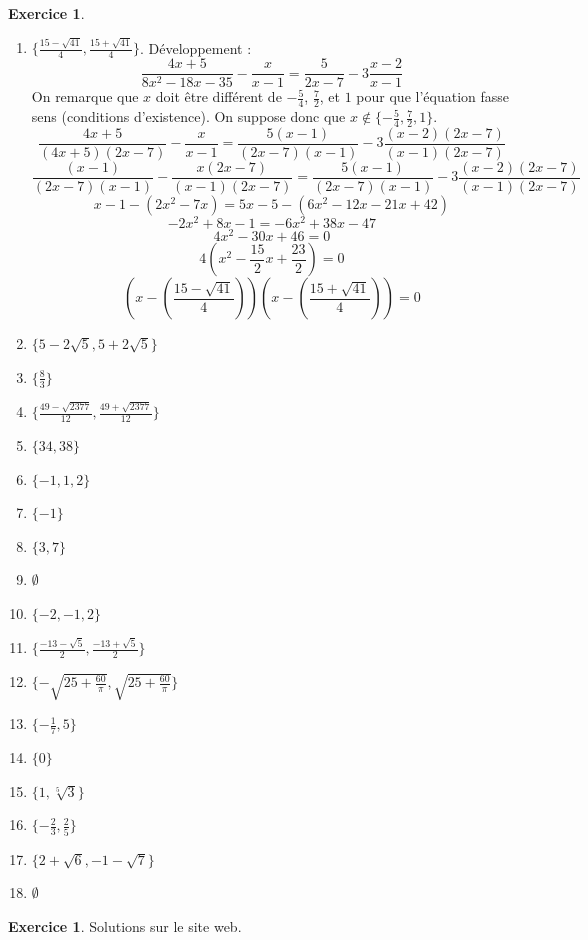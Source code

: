 \documentclass[a4paper,13pt]{scrreprt}
\theoremstyle{plain}
\theoremstyle{definition}
\newtheorem{exo}[subsection]{Exercice}
\begin{document}
\begin{exo} \begin{enumerate}
		\item $\{ \frac{15 - \sqrt{41}}{4},\frac{15 + \sqrt{41}}{4} \}$. Développement : \\
		$$\frac{4x+5}{8x^2-18x-35} - \frac{x}{x-1} = \frac{5}{2x-7}-3\frac{x-2}{x-1}$$
		On remarque que $x$ doit être différent de $-\frac{5}{4}$, $\frac{7}{2}$, et $1$ pour que l'équation fasse sens (conditions d'existence). On suppose donc que $x \notin \{ -\frac{5}{4}, \frac{7}{2} , 1 \}$.
		$$\frac{4x+5}{(4x+5)(2x-7)} - \frac{x}{x-1} = \frac{5(x-1)}{(2x-7)(x-1)}-3\frac{(x-2)(2x-7)}{(x-1)(2x-7)}$$
		$$\frac{(x-1)}{(2x-7)(x-1)} - \frac{x(2x-7)}{(x-1)(2x-7)} = \frac{5(x-1)}{(2x-7)(x-1)}-3\frac{(x-2)(2x-7)}{(x-1)(2x-7)}$$
		$$x-1 - (2x^2 - 7x) = 5x - 5 - (6x^2 - 12 x - 21x + 42)$$
		$$-2x^2 + 8x - 1 = -6x^2 +38x - 47$$
		$$4x^2 - 30x + 46 = 0$$
		$$4\left(x^2 - \frac{15}{2}x + \frac{23}{2}\right) = 0$$
		$$\left(x - \left(\frac{15 - \sqrt{41}}{4}\right)\right)\left(x -\left(\frac{15 + \sqrt{41}}{4}\right)\right) = 0$$
		\item $\{ 5-2\sqrt{5},5+2\sqrt{5} \}$
		\item $\{ \frac{8}{3} \}$
		\item $\{ \frac{49 - \sqrt{2377}}{12},\frac{49 + \sqrt{2377}}{12} \}$
		\item $\{ 34,38 \}$
		\item $\{ -1,1,2 \}$
		\item $\{ -1 \}$
		\item $\{ 3,7 \}$
		\item $\emptyset$
		\item $\{ -2,-1,2 \}$
		\item $\{ \frac{-13 - \sqrt{5}}{2},\frac{-13 + \sqrt{5}}{2} \}$
		\item $\{ -\sqrt{25+\frac{60}{\pi}},\sqrt{25+\frac{60}{\pi}} \}$
		\item $\{ -\frac{1}{7},5 \}$
		\item $\{ 0 \}$
		\item $\{ 1,\sqrt[5]{3} \}$
		\item $\{ -\frac{2}{3},\frac{2}{5} \}$
		\item $\{ 2+\sqrt{6},-1-\sqrt{7} \}$
		\item $\emptyset$
	\end{enumerate}
\end{exo}

\begin{exo}
	Solutions sur le site web.
\end{exo}
\end{document}
